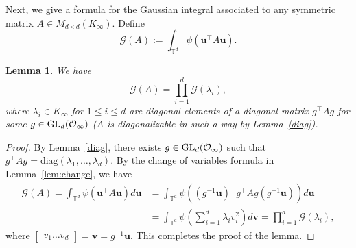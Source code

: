\documentclass[10pt]{amsart}
\theoremstyle{plain}
\theoremstyle{plain}
\newtheorem{lemma}[theorem]{Lemma}
\renewcommand{\vec}[1]{\mathbf{#1}}
\theoremstyle{remark}
\theoremstyle{definition}
\newcommand{\GL}{\textup{GL}}
\newcommand{\TT}{\mathbb{T}}
\newcommand{\cO}{\mathcal{O}}
\newcommand{\cG}{\mathcal{G}}
\begin{document}
Next, we give a formula for the Gaussian integral associated to any symmetric matrix $A \in M_{d\times d}(K_{\infty}).$ Define
\[
\cG(A):=\int_{\TT^d}\psi(\vec{u}^{\intercal}A\vec{u}).
\]

\begin{lemma}\label{gauint}
We have 
\[
\cG(A)=\prod_{i=1}^d \cG(\lambda_i),
\]
where $\lambda_i \in K_{\infty}$ for $1 \leq i\leq d$ are diagonal elements of a diagonal matrix $g^{\intercal}Ag$ for some $g\in \GL_d(\cO_{\infty})$ ($A$ is diagonalizable in such a way by Lemma~\ref{diag}). \end{lemma}
\begin{proof}
By Lemma~\ref{diag}, there exists $g\in \GL_d(\cO_{\infty}) $ such that $g^{\intercal}Ag=\text{diag}(\lambda_1,\dots,\lambda_d).$  By the change of variables formula in Lemma~\ref{lem:change}, we have 
\begin{equation*}
\begin{split}
\cG(A)=\int_{\TT^d}\psi(\vec{u}^{\intercal}A\vec{u}) d\vec{u}&=\int_{\TT^d}\psi\left((g^{-1}\vec{u} )^{\intercal} g^{\intercal}Ag (g^{-1}\vec{u})\right) d\vec{u}
\\
&=\int_{\TT^d}\psi\left( \sum_{i=1}^d \lambda_i v_i^2 \right) d\vec{v}=\prod_{i=1}^d \cG(\lambda_i),
\end{split}
\end{equation*}
where $\begin{bmatrix}v_1 \hdots v_d \end{bmatrix}=\vec{v}=g^{-1}\vec{u}.$ This completes the proof of the lemma. 
\end{proof}
\end{document}
